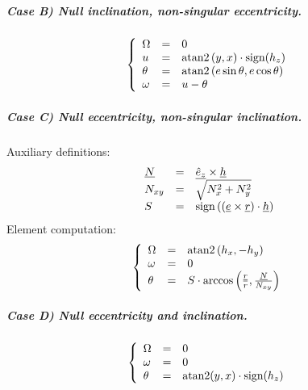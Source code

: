 		\subparagraph{Case B) Null inclination, non-singular eccentricity. \\}
		\[
		\left\{
		\begin{array}{lll}
		\Omega 	& = & 0 \\
		u 		& = & \text{atan2}\left( y, x \right) \cdot \text{sign} (h_z) \\
		\theta 	& = & \text{atan2}\left(e\sin\theta, e\cos\theta\right)\\
		\omega 	& = & u - \theta
		\end{array}\right.
		\]
		\subparagraph{Case C) Null eccentricity, non-singular inclination. \\}
		\indent Auxiliary definitions:
		\[\begin{array}{lll}
		\underline{N} 	& = & \underline{\hat{e}_z} \times \underline{h} \\
		N_{xy} 			& = & \sqrt{N_x^2 + N_y^2} \\
		S 				& = & \text{sign}\left( (\underline{e} \times\underline{r}) \cdot \underline{h} \right)
		\end{array}
		\]
		\indent Element computation:
		\[
		\left\{
		\begin{array}{lll}
		\Omega 	& = & \text{atan2}\left( h_x, -h_y\right)\\
		\omega 	& = & 0 \\
		\theta 	& = & S \cdot \arccos\left( \frac{\underline{r}}{r}, \frac{\underline{N}}{N_{xy}} \right)\\
		\end{array}\right.
		\]
		\subparagraph{Case D) Null eccentricity and inclination. \\}
		\[
		\left\{
		\begin{array}{lll}
		\Omega 	& = & 0 \\
		\omega 	& = & 0 \\
		\theta 	& = & \text{atan2}(y, x) \cdot \text{sign}(h_z)\\
		\end{array}\right.
		\]
